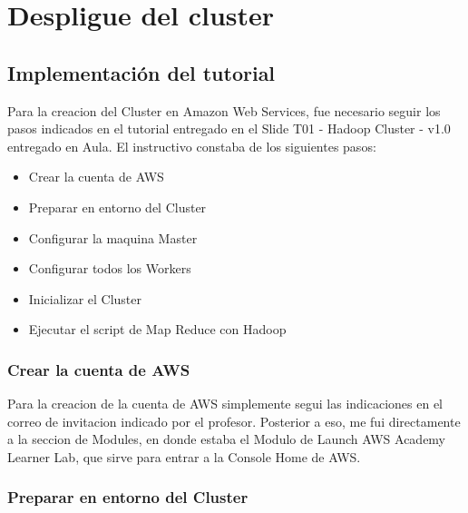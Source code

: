 \documentclass[9pt,letterpaper,twoside]{article}
\begin{document}

\newpage


\section{Despligue del cluster}

\subsection{Implementación del tutorial}

\noindent
Para la creacion del Cluster en Amazon Web Services, fue necesario seguir los pasos indicados en el tutorial
entregado en el Slide T01 - Hadoop Cluster - v1.0 entregado en Aula. El instructivo constaba de los siguientes
pasos:
\begin{itemize}
    \item Crear la cuenta de AWS
    \item Preparar en entorno del Cluster
    \item Configurar la maquina Master
    \item Configurar todos los Workers
    \item Inicializar el Cluster
    \item Ejecutar el script de Map Reduce con Hadoop
\end{itemize}

\subsubsection*{Crear la cuenta de AWS}

\noindent
Para la creacion de la cuenta de AWS simplemente segui las indicaciones en el correo de invitacion indicado por el profesor.
Posterior a eso, me fui directamente a la seccion de Modules, en donde estaba el Modulo de Launch AWS Academy Learner Lab,
que sirve para entrar a la Console Home de AWS.

\subsubsection*{Preparar en entorno del Cluster}
\end{document}
